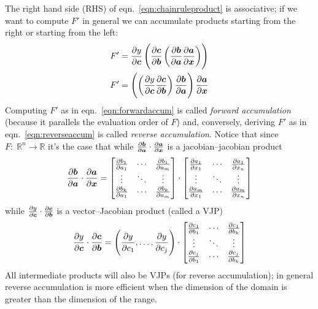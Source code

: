 The right hand side (RHS) of eqn.~\eqref{eqn:chainruleproduct} is associative; if we want to compute \(F'\) in general we can accumulate products starting from the right or starting from the left:
%
\begin{align}
    F' & = \pdv{y}{\bm{c}}
    \left( \pdv{\bm{c}}{\bm{b}}
    \left( \pdv{\bm{b}}{\bm{a}}
    \pdv{\bm{a}}{\bm{x}}\right)\right) \label{eqn:forwardaccum} \\
    F' & =  \left( \left( \pdv{y}{\bm{c}}
    \pdv{\bm{c}}{\bm{b}} \right)
    \pdv{\bm{b}}{\bm{a}} \right)
    \pdv{\bm{a}}{\bm{x}} \label{eqn:reverseaccum}
\end{align}
%
Computing \(F'\) as in eqn.~\eqref{eqn:forwardaccum} is called \textit{forward accumulation} (because it parallels the evaluation order of \(F\)) and, conversely, deriving \(F'\) as in eqn.~\eqref{eqn:reverseaccum} is called \textit{reverse accumulation}.
%
Notice that since \(F\colon\; \mathbb{R}^n  \rightarrow \mathbb{R}\) it's the case that while \(\pdv{\bm{b}}{\bm{a}}\cdot \pdv{\bm{a}}{\bm{x}}\) is a jacobian--jacobian product
\begin{equation}
    \pdv{\bm{b}}{\bm{a}}\cdot
    \pdv{\bm{a}}{\bm{x}} =         \begin{bmatrix}
        \pdv{b_1}{a_1} & \cdots & \pdv{b_1}{a_m} \\
        \vdots         & \ddots & \vdots         \\
        \pdv{b_k}{a_1} & \cdots & \pdv{b_k}{a_m}
    \end{bmatrix}
    \cdot
    \begin{bmatrix}
        \pdv{a_1}{x_1} & \cdots & \pdv{a_1}{x_n} \\
        \vdots         & \ddots & \vdots         \\
        \pdv{a_m}{x_1} & \cdots & \pdv{a_m}{x_n}
    \end{bmatrix}
\end{equation}
%
while \(\pdv{y}{\bm{c}}\cdot \pdv{\bm{c}}{\bm{b}}\) is a vector--Jacobian product (called a VJP)
%
\begin{equation}
    \pdv{y}{\bm{c}}\cdot
    \pdv{\bm{c}}{\bm{b}} = \left( \pdv{y}{c_1}, \dots,  \pdv{y}{c_j} \right)
    \cdot
    \begin{bmatrix}
        \pdv{c_1}{b_1} & \cdots & \pdv{c_1}{b_k} \\
        \vdots         & \ddots & \vdots         \\
        \pdv{c_j}{b_1} & \cdots & \pdv{c_j}{b_k}
    \end{bmatrix}
\end{equation}
%
All intermediate products will also be VJPs (for reverse accumulation); in general reverse accumulation is more efficient when the dimension of the domain is greater than the dimension of the range.

